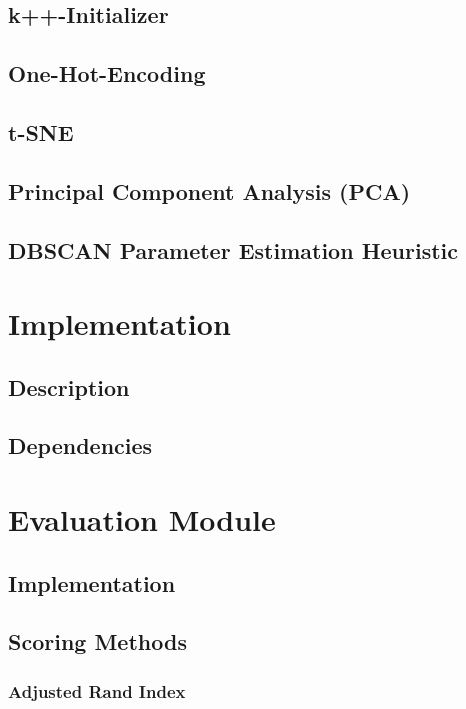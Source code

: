 \documentclass[12pt, english]
{article}
\begin{document}
\subsection{k++-Initializer}

\subsection{One-Hot-Encoding}

\subsection{t-SNE}

\subsection{Principal Component Analysis (PCA)}

\subsection{DBSCAN Parameter Estimation Heuristic} \label{dbscanheuristic}


\section{Implementation}
\subsection{Description}

\subsection{Dependencies}


\section{Evaluation Module}
\subsection{Implementation}

\subsection{Scoring Methods}
\subsubsection{Adjusted Rand Index}

\end{document}
